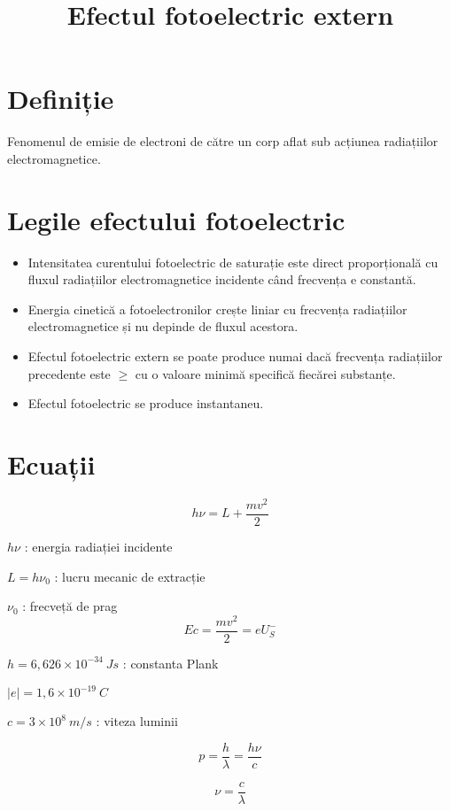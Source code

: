 \documentclass{article}
\title{Efectul fotoelectric extern}
\date{}
\begin{document}
\maketitle

\section*{Definiție}
Fenomenul de emisie de electroni de către un corp aflat sub acțiunea radiațiilor electromagnetice.
\section*{Legile efectului fotoelectric}
\begin{itemize}
	\item Intensitatea curentului fotoelectric de saturație este direct proporțională cu fluxul radiațiilor electromagnetice incidente când frecvența e constantă.
	\item Energia cinetică a fotoelectronilor crește liniar cu frecvența radiațiilor electromagnetice și nu depinde de fluxul acestora.
	\item Efectul fotoelectric extern se poate produce numai dacă frecvența radiațiilor precedente este $\geq$ cu o valoare minimă specifică fiecărei substanțe.
	\item Efectul fotoelectric se produce instantaneu.
\end{itemize}

\section*{Ecuații}
\begin{multicols}{2}
$$
h\nu = L + \frac{mv^2}{2}
$$

$h\nu$ : energia radiației incidente

$L = h\nu_0$ : lucru mecanic de extracție

$\nu_0$ : frecveță de prag
\columnbreak
$$
E c = \frac{mv^2}{2} = e U_S^-
$$

$h = 6,626 \times 10^{-34}\ J s$ : constanta Plank

$|e| = 1,6 \times 10^{-19}\ C$

$c = 3 \times 10^{8}\ m/s$ : viteza luminii
\end{multicols}
\begin{multicols}{2}
$$
p = \frac{h}{\lambda} = \frac{h\nu}{c}
$$

$$
\nu = \frac{c}{\lambda}
$$
\end{multicols}
\end{document}
